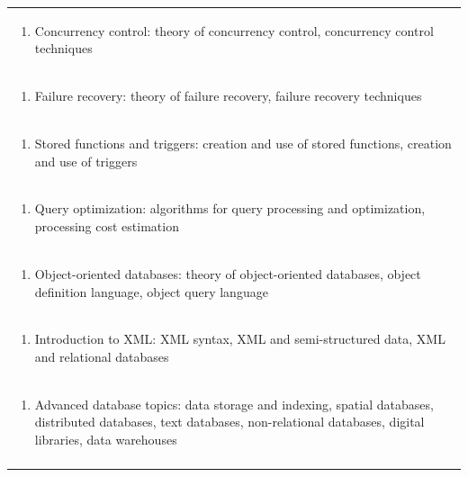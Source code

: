 \documentclass[11pt]{article}
\begin{document}
\begin{center}
\begin{longtable}{|p{4cm}|p{4cm}|p{4cm}|p{4cm}|}
\multicolumn{4}{|p{\dimexpr 16cm + 6\tabcolsep\relax}|}{\begin{enumerate}[start=2]\item Concurrency control: theory of concurrency control, concurrency control techniques\end{enumerate}}\\
\multicolumn{4}{|p{\dimexpr 16cm + 6\tabcolsep\relax}|}{\begin{enumerate}[start=3]\item Failure recovery: theory of failure recovery, failure recovery techniques\end{enumerate}}\\
\multicolumn{4}{|p{\dimexpr 16cm + 6\tabcolsep\relax}|}{\begin{enumerate}[start=4]\item Stored functions and triggers: creation and use of stored functions, creation and use of triggers\end{enumerate}}\\
\multicolumn{4}{|p{\dimexpr 16cm + 6\tabcolsep\relax}|}{\begin{enumerate}[start=5]\item Query optimization: algorithms for query processing and optimization, processing cost estimation\end{enumerate}}\\
\multicolumn{4}{|p{\dimexpr 16cm + 6\tabcolsep\relax}|}{\begin{enumerate}[start=6]\item Object-oriented databases: theory of object-oriented databases, object definition language, object query language\end{enumerate}}\\
\multicolumn{4}{|p{\dimexpr 16cm + 6\tabcolsep\relax}|}{\begin{enumerate}[start=7]\item Introduction to XML: XML syntax, XML and semi-structured data, XML and relational databases\end{enumerate}}\\
\multicolumn{4}{|p{\dimexpr 16cm + 6\tabcolsep\relax}|}{\begin{enumerate}[start=8]\item Advanced database topics: data storage and indexing, spatial databases, distributed databases, text databases, non-relational databases, digital libraries, data warehouses\end{enumerate}}\\
\multicolumn{4}{|p{\dimexpr 16cm + 6\tabcolsep\relax}|}{}\\

\end{longtable}
\end{center}
\end{document}
